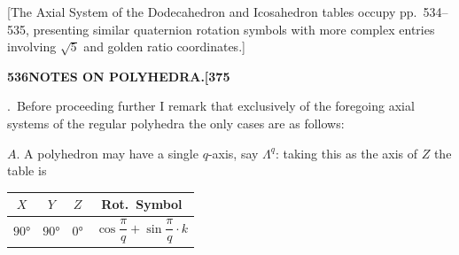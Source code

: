 \documentclass[11pt,a4paper]{article}
\begin{document}
[The Axial System of the Dodecahedron and Icosahedron tables occupy pp.~534--535, presenting similar quaternion rotation symbols with more complex entries involving $\surd 5$ and golden ratio coordinates.]

\newpage
\noindent\textbf{536\hspace{1em}NOTES ON POLYHEDRA.\hfill[375}

\vspace{12pt}

.~Before proceeding further I remark that exclusively of the foregoing axial systems of the regular polyhedra the only cases are as follows:

$A$. A polyhedron may have a single $q$-axis, say $\Lambda^{q}$: taking this as the axis of $Z$ the table is
\begin{center}
\begin{tabular}{|c|c|c|c|}
\hline
$X$ & $Y$ & $Z$ & Rot.~Symbol \\
\hline
$90°$ & $90°$ & $0°$ & $\cos\dfrac{\pi}{q} + \sin\dfrac{\pi}{q}\cdot k$ \\
\hline
\end{tabular}
\end{center}
\end{document}
